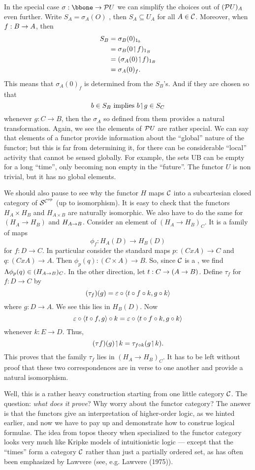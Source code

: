In the special case $\sigma :\bbone \to \PU$ we can simplify the choices
out of $(\mathcal P U)_A$ even further. Write $S_A= \sigma_A(O)$ , then $S_A\subseteq U_A$ for all $A \in \mathcal C$. Moreover, when $f: B \rightarrow A$, then
\begin{align*}
S_B &= \sigma_B(0)_{{\mathrm 1}_b}\\
&= \sigma_B(0 \!\upharpoonleft\! f)_{{\mathrm 1} _B}\\
&= (\sigma_A(0) \!\upharpoonleft\! f)_{{\mathrm 1} _B}\\
&= \sigma_A(0)_f .
\end{align*}
This means that $\sigma_A(0)_f$ is determined from the $S_B$'s. And if they are chosen so that
$$
b \in S_B {\textrm{ implies }} b \!\upharpoonleft\! g \in S_C
$$
whenever $g: C\to B$, then the $\sigma_A$ so defined from them provides a
natural transformation. Again, we see the elements of $\mathcal P U$ are rather special. We can say that elements of a functor provide
information about the ``global'' nature of the functor; but this is far from determining it, for there can be considerable ``local'' activity that cannot be sensed globally. For example, the sets UB can be empty for a long ``time'', only becoming non empty in the ``future''. The functor $U$ is non trivial, but it has no global elements.

We should also pause to see why the functor $H$ maps $\mathcal C$ into a
subcartesian closed category of $\mathcal S^{\mathcal C^{op}}$ (up to isomorphism). It
is easy to check that the functors $H_A \times H_B$ and $H_{A \times B}$ are naturally isomorphic. We also have to do the same for $(H_A \to H_B)$ and $H_{A \rightarrow B}$. Consider an element of $(H_A\to H_B)_C$. It is a family of maps
$$
\phi_f : H_A(D) \to H_B(D)
$$
for $f: D\to C$. In particular consider the standard maps
$p: (C x A) \to C$ and $q : (C x A)\to A$.
Then $\phi_p(q) : (C \times A)\to B$.
So, since $\mathcal C$ is a \ccc, we find $\Lambda\phi_p(q) \in (H_{A \rightarrow B})_C$. In the
other direction, let $t : C\rightarrow (A \rightarrow B)$.
Define $\tau_f$ for $f : D\to C$ by
$$
(\tau_f)(g) = \varepsilon \circ \langle t \circ f \circ k, g \circ k \rangle
$$
where $g : D \to A$. We see this lies in $H_B(D)$. Now
$$
\varepsilon \circ \langle t \circ f, g\rangle \circ k = \varepsilon \circ \langle t \circ f \circ k, g \circ k\rangle
$$
whenever $k: E \to D$. Thus,
$$
(\tau f)(g) \!\upharpoonleft\! k = \tau_{f \circ k}(g \!\upharpoonleft\! k).
$$
This proves that the family $\tau_f$ lies in $(H_A \to H_B)_C$. It has to be left without proof that these two correspondences are in verse to one another and provide a natural isomorphism.

Well, this is a rather heavy construction starting from one little category $\mathcal C$. The question: {\it what does it prove}? Why worry about the functor category? The answer is that the functors give an interpretation of higher-order logic, as we hinted earlier, and now we have to pay up and demonstrate
how to construe logical formulae. The idea from topos theory when specialized to the functor category looks very much like Kripke models of intuitionistic logic --- except that the ``times'' form a category $\mathcal C$ rather than just a partially ordered set, as has often been emphasized by Lawvere (see, e.g. Lawvere (1975)).

